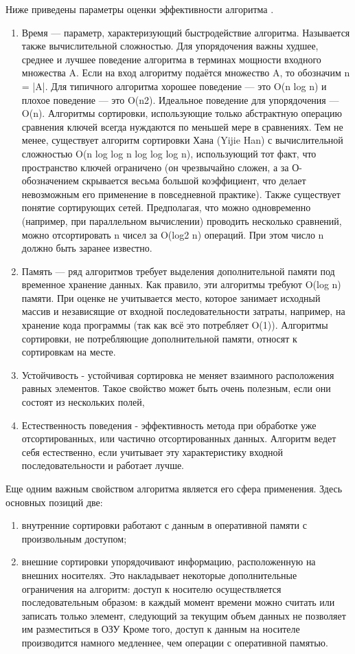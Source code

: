 \documentclass[a4paper, 14pt]{article}
\begin{document}
Ниже приведены параметры оценки эффективности алгоритма \cite{alg_params}.
\begin{enumerate}
\item Время — параметр, характеризующий быстродействие алгоритма. Называется также вычислительной сложностью. Для упорядочения важны худшее, среднее и лучшее поведение алгоритма в терминах мощности входного множества A. Если на вход алгоритму подаётся множество A, то обозначим n = |A|. Для типичного алгоритма хорошее поведение — это O(n log n) и плохое поведение — это O(n2). Идеальное поведение для упорядочения — O(n). Алгоритмы сортировки, использующие только абстрактную операцию сравнения ключей всегда нуждаются по меньшей мере в сравнениях. Тем не менее, существует алгоритм сортировки Хана (Yijie Han) с вычислительной сложностью O(n log log n log log log n), использующий тот факт, что пространство ключей ограничено (он чрезвычайно сложен, а за О-обозначением скрывается весьма большой коэффициент, что делает невозможным его применение в повседневной практике). Также существует понятие сортирующих сетей. Предполагая, что можно одновременно (например, при параллельном вычислении) проводить несколько сравнений, можно отсортировать n чисел за O(log2 n) операций. При этом число n должно быть заранее известно.
\item Память — ряд алгоритмов требует выделения дополнительной памяти под временное хранение данных. Как правило, эти алгоритмы требуют O(log n) памяти. При оценке не учитывается место, которое занимает исходный массив и независящие от входной последовательности затраты, например, на хранение кода программы (так как всё это потребляет O(1)). Алгоритмы сортировки, не потребляющие дополнительной памяти, относят к сортировкам на месте.
\item Устойчивость - устойчивая сортировка не меняет взаимного расположения равных элементов. Такое свойство может быть очень полезным, если они состоят из нескольких полей, 
\item Естественность поведения - эффективность метода при обработке уже отсортированных, или частично отсортированных данных. Алгоритм ведет себя естественно, если учитывает эту характеристику входной последовательности и работает лучше.

\end{enumerate}

Еще одним важным свойством алгоритма является его сфера применения. Здесь основных позиций две:
\begin{enumerate}
\item внутренние сортировки работают с данным в оперативной памяти с произвольным доступом;
\item внешние сортировки упорядочивают информацию, расположенную на внешних носителях. Это накладывает некоторые дополнительные ограничения на алгоритм:
доступ к носителю осуществляется последовательным образом: в каждый момент времени можно считать или записать только элемент, следующий за текущим
объем данных не позволяет им разместиться в ОЗУ
Кроме того, доступ к данным на носителе производится намного медленнее, чем операции с оперативной памятью.
\end{enumerate}
\end{document}
